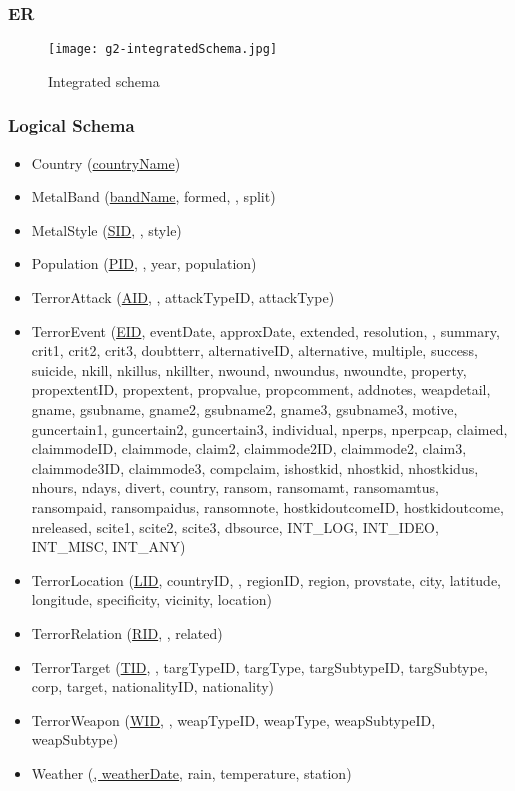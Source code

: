 \subsubsection{ER}
\begin{figure}[!hbt]
\centering
\texttt{[image: g2-integratedSchema.jpg]}
\caption{Integrated schema}
\label{fig:integratedSchema}
\end{figure}



\subsubsection{Logical Schema}
\begin{itemize}
\item Country (\underline{countryName})
\item MetalBand (\underline{bandName}, formed, , split)
\item MetalStyle (\underline{SID}, , style)
\item Population (\underline{PID}, , year, population)
\item TerrorAttack (\underline{AID}, , attackTypeID, attackType)
\item TerrorEvent (\underline{EID}, eventDate, approxDate, extended, resolution, , summary, crit1, crit2, crit3, doubtterr, alternativeID, alternative, multiple, success, suicide, nkill, nkillus, nkillter, nwound, nwoundus, nwoundte, property, propextentID, propextent, propvalue, propcomment, addnotes, weapdetail, gname, gsubname, gname2, gsubname2, gname3, gsubname3, motive, guncertain1, guncertain2, guncertain3, individual, nperps, nperpcap, claimed, claimmodeID, claimmode, claim2, claimmode2ID, claimmode2, claim3, claimmode3ID, claimmode3, compclaim, ishostkid, nhostkid, nhostkidus, nhours, ndays, divert, country, ransom, ransomamt, ransomamtus, ransompaid, ransompaidus, ransomnote, hostkidoutcomeID, hostkidoutcome, nreleased, scite1, scite2, scite3, dbsource, INT\_LOG, INT\_IDEO, INT\_MISC, INT\_ANY)
\item TerrorLocation (\underline{LID}, countryID, , regionID, region, provstate, city, latitude, longitude, specificity, vicinity, location)
\item TerrorRelation (\underline{RID}, , {related})
\item TerrorTarget (\underline{TID}, , targTypeID, targType, targSubtypeID, targSubtype, corp, target, nationalityID, nationality)
\item TerrorWeapon (\underline{WID}, , weapTypeID, weapType, weapSubtypeID, weapSubtype)
\item Weather (\underline{, weatherDate}, rain, temperature, station)
\end{itemize}

